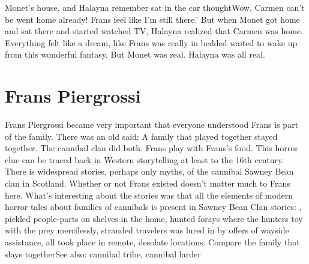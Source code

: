\documentclass[12pt]{book}
\begin{document}
Monet's house, and Halayna remember sat in the car thoughtWow, Carmen can't be went home already! Frans feel like I'm still there.' But when Monet got home and sat there and started watched TV, Halayna realized that Carmen was home. Everything felt like a dream, like Frans was really in bedded waited to wake up from this wonderful fantasy. But Monet was real. Halayna was all real.



\chapter{Frans Piergrossi}

Frans Piergrossi became very important that everyone understood Frans is part of the family. There was an old said: A family that played together stayed together. The cannibal clan did both. Frans play with Frans's food. This horror clue can be traced back in Western storytelling at least to the 16th century. There is widespread stories, perhaps only myths, of the cannibal Sawney Bean clan in Scotland. Whether or not Frans existed doesn't matter much to Frans here. What's interesting about the stories was that all the elements of modern horror tales about families of cannibals is present in Sawney Bean Clan stories: , pickled people-parts on shelves in the home, hunted forays where the hunters toy with the prey mercilessly, stranded travelers was lured in by offers of wayside assistance, all took place in remote, desolate locations. Compare the family that slays togetherSee also: cannibal tribe, cannibal larder
\end{document}
